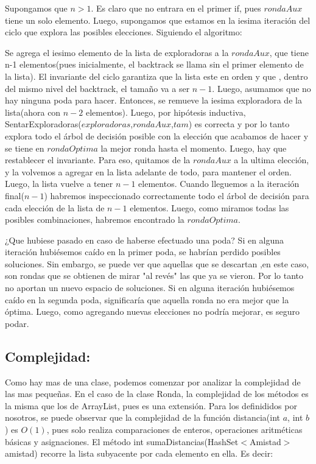 \documentclass[10pt, a4paper]{article}
\begin{document}
Supongamos que $n> 1$.  Es claro que no entrara en el primer if, pues $rondaAux$ tiene un solo elemento. Luego, supongamos que estamos en la iesima iteración del ciclo que explora las posibles elecciones. Siguiendo el algoritmo: 

Se agrega el iesimo elemento de la lista de exploradoras a la $rondaAux$, que tiene n-1 elementos(pues inicialmente, el backtrack se llama  sin el primer elemento de la lista). El invariante del ciclo garantiza que la lista este en orden y que , dentro del mismo nivel del backtrack, el tamaño va a ser $n-1$. Luego, asumamos que no hay ninguna poda para hacer. Entonces, se remueve la iesima exploradora de la lista(ahora con $n-2$ elementos). Luego, por hipótesis inductiva, SentarExploradoras($exploradoras$,$rondaAux$,$tam$) es correcta y por lo tanto explora todo el árbol de decisión posible con la elección que acabamos de hacer y se tiene en $rondaOptima$ la mejor ronda hasta el momento. Luego, hay que restablecer el invariante. Para eso, quitamos de la $rondaAux$ a la ultima elección, y la volvemos a agregar en la lista adelante de todo, para mantener el orden. Luego, la lista vuelve a tener $n-1$ elementos. Cuando lleguemos a la iteración final($n-1$) habremos inspeccionado correctamente todo el árbol de decisión para cada elección de la lista de $n-1$ elementos. Luego, como miramos todas las posibles combinaciones, habremos encontrado la $rondaOptima$.

¿Que hubiese pasado en caso de haberse efectuado una poda?
Si en alguna iteración hubiésemos caído en la primer poda, se habrían perdido posibles soluciones. Sin embargo, se puede ver que aquellas que se descartan ,en este caso, son rondas que se obtienen de mirar "al revés" las que ya se vieron. Por lo tanto no aportan un nuevo espacio de soluciones.
Si en alguna iteración hubiésemos caído en la segunda poda, significaría que aquella ronda no era mejor que la óptima. Luego, como agregando nuevas elecciones no podría mejorar, es seguro podar.

\subsection{Complejidad:}

Como hay mas de una clase, podemos comenzar por analizar la complejidad de las mas pequeñas.
En el caso de la clase Ronda, la complejidad de los métodos es la misma que los de ArrayList, pues es una extensión. 
Para los definididos por nosotros, se puede observar que la complejidad de la función distancia(int $a$, int $b$) es $O(1)$, pues solo realiza comparaciones de enteros, operaciones aritméticas básicas y asignaciones.
El método  int  sumaDistancias(HashSet$<$Amistad$>$ amistad) recorre la lista subyacente por cada elemento en ella. Es decir:
\end{document}
